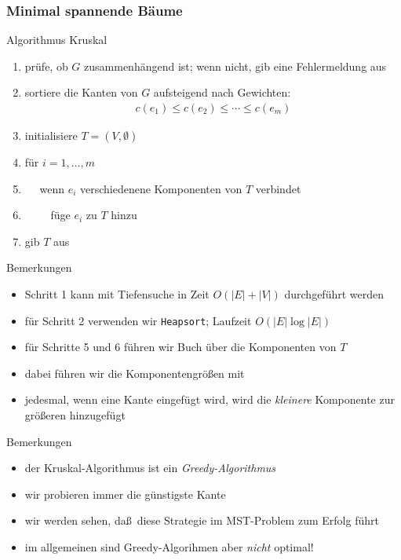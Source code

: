 \documentclass[aspectratio=1610, 11pt]{beamer}
\newcommand{\mytitle}{Minimal spannende B\"aume}
\begin{document}
\begin{frame}\frametitle{\mytitle}
	\begin{overprint}
		\begin{exampleblock}{Algorithmus Kruskal}
			\begin{enumerate}
				\item pr\"ufe, ob $G$ zusammenh\"angend ist; wenn nicht, gib eine Fehlermeldung aus
				\item sortiere die Kanten von $G$ aufsteigend nach Gewichten:
					\begin{align*}
						c(e_1)\leq c(e_2)\leq\cdots \leq c(e_m)
					\end{align*}
				\item initialisiere $T=(V,\emptyset)$
				\item f\"ur $i=1,\ldots,m$
				\item $\quad$ wenn $e_i$ verschiedenene Komponenten von $T$ verbindet
				\item $\quad\quad$ f\"uge $e_i$ zu $T$ hinzu
				\item gib $T$ aus
			\end{enumerate}
		\end{exampleblock}
		\begin{exampleblock}{Bemerkungen}
			\begin{itemize}
				\item Schritt 1 kann mit Tiefensuche in Zeit $O(|E|+|V|)$ durchgef\"uhrt werden
				\item f\"ur Schritt 2 verwenden wir {\tt Heapsort}; Laufzeit $O(|E|\log|E|)$
				\item f\"ur Schritte 5 und 6 f\"uhren wir Buch \"uber die Komponenten von $T$
				\item dabei f\"uhren wir die Komponentengr\"o\ss en mit
				\item jedesmal, wenn eine Kante eingef\"ugt wird, wird die \emph{kleinere} Komponente zur gr\"o\ss eren hinzugef\"ugt
			\end{itemize}
		\end{exampleblock}
		\begin{exampleblock}{Bemerkungen}
			\begin{itemize}
				\item der Kruskal-Algorithmus ist ein \emph{Greedy-Algorithmus}
				\item wir probieren immer die g\"unstigste Kante
				\item wir werden sehen, da\ss\ diese Strategie im MST-Problem zum Erfolg f\"uhrt
				\item im allgemeinen sind Greedy-Algorihmen aber \emph{nicht} optimal!
			\end{itemize}
		\end{exampleblock}
	\end{overprint}
\end{frame}
\end{document}

